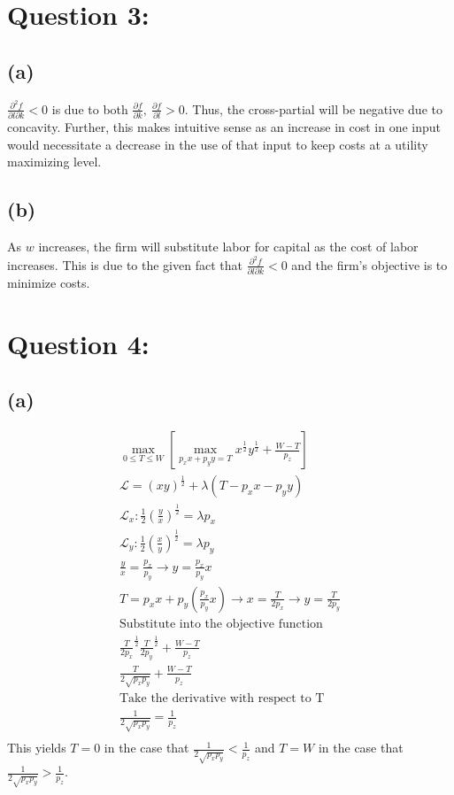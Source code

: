 \documentclass[10pt, a4paper]{article}
\begin{document}
\section*{Question 3:}
    \subsection*{(a)}
      $\frac{\partial^2 f}{\partial l\partial k}<0$ is due to both $\frac{\partial f}{\partial k}, \ \frac{\partial f}{\partial l} >0$. Thus, the cross-partial will be negative due to concavity.
      Further, this makes intuitive sense as an increase in cost in one input would necessitate a decrease in the use of that input to keep costs at a utility maximizing level.
    
    \subsection*{(b)}
      As $w$ increases, the firm will substitute labor for capital as the cost of labor increases. This is due to the given fact that $\frac{\partial^2 f}{\partial l\partial k}<0$ and the firm's objective is to minimize costs.
\section*{Question 4:}
    \subsection*{(a)}
      \begin{gather*}
        {\max_{0\leq T \leq W}} [\max_{p_xx + p_yy = T} x^{\frac{1}{2}}y^{\frac{1}{2}} + \frac{W-T}{p_z}] \\
        \mathcal{L} = (xy)^{\frac{1}{2}} + \lambda(T-p_xx-p_yy)\\
        \mathcal{L}_x: \frac{1}{2}(\frac{y}{x})^{\frac{1}{2}} = \lambda p_x \\
        \mathcal{L}_y: \frac{1}{2}(\frac{x}{y})^{\frac{1}{2}} = \lambda p_y \\
        \frac{y}{x} = \frac{p_x}{p_y} \rightarrow y = \frac{p_x}{p_y}x \\
        T = p_xx + p_y(\frac{p_x}{p_y}x) \rightarrow x = \frac{T}{2p_x} \rightarrow y = \frac{T}{2p_y} \\
        \text{Substitute into the objective function} \\
        \frac{T}{2p_x}^{\frac{1}{2}}\frac{T}{2p_y}^{\frac{1}{2}} + \frac{W-T}{p_z} \\
        \frac{T}{2\sqrt{p_xp_y}} + \frac{W-T}{p_z} \\
        \text{Take the derivative with respect to T} \\
        \boxed{\frac{1}{2\sqrt{p_xp_y}} = \frac{1}{p_z}} \\
      \end{gather*}
      This yields $T = 0$ in the case that $\frac{1}{2\sqrt{p_xp_y}} < \frac{1}{p_z}$ and $T = W$ in the case that $\frac{1}{2\sqrt{p_xp_y}} > \frac{1}{p_z}$.
\end{document}
